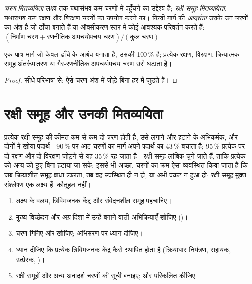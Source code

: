 \begin{definition}[मितव्ययिताएँ और आदर्शता]\label{def:b3:total-synthesis:economy}
\emph{चरण मितव्ययिता} लक्ष्य तक यथासंभव कम चरणों में
पहुँचने का उद्देश्य है; \emph{रक्षी-समूह मितव्ययिता},
यथासंभव कम रक्षण और विरक्षण चरणों का उपयोग करने का। किसी मार्ग की
\emph{आदर्शता} उसके उन चरणों का अंश है जो
ढाँचा बनाते हैं या ऑक्सीकरण स्तर में कोई आवश्यक परिवर्तन करते हैं:
$(\text{निर्माण चरण} + \text{रणनीतिक अपचयोपचय चरण})/(\text{कुल चरण})$।
\end{definition}

\begin{proposition}[किसी मार्ग की आदर्शता]\label{prop:b3:total-synthesis:ideality}
एक-पात्र मार्ग जो केवल ढाँचे के आबंध बनाता है, उसकी  100\,\% है; प्रत्येक रक्षण,
विरक्षण, क्रियात्मक-समूह अंतर्रूपांतरण या गैर-रणनीतिक अपचयोपचय चरण
उसे घटाता है।
\end{proposition}

\begin{proof}
सीधे परिभाषा से: ऐसे चरण अंश में जोड़े बिना हर में
जुड़ते हैं।
\end{proof}

\section{रक्षी समूह और उनकी मितव्ययिता}

प्रत्येक रक्षी समूह की कीमत कम से कम दो चरण होती है, उसे लगाने और
हटाने के अभिकर्मक, और दोनों में खोया पदार्थ। 90\,\% पर आठ चरणों का मार्ग
अपने पदार्थ का 43\,\% बचाता है; 95\,\% प्रत्येक पर दो रक्षण और दो विरक्षण जोड़ने से
यह 35\,\% रह जाता है। रक्षी समूह लांबिक चुने जाते हैं, ताकि प्रत्येक को
अन्य को छुए बिना हटाया जा सके; इससे भी अच्छा, चरणों का क्रम ऐसा
व्यवस्थित किया जाता है कि जब क्रियाशील समूह बाधा डालता, तब वह उपस्थित ही न हो, या अभी
प्रकट न हुआ हो: रक्षी-समूह-मुक्त संश्लेषण एक लक्ष्य हैं, कौतूहल नहीं।

\begin{method}[किसी पूर्ण संश्लेषण को पढ़ना]\label{met:b3:total-synthesis:analyse}
\begin{enumerate}
  \item लक्ष्य के वलय, त्रिविमजनक केंद्र और संवेदनशील समूह पहचानिए।
  \item मुख्य विच्छेदन और अग्र दिशा में उन्हें बनाने वाली अभिक्रियाएँ खोजिए
        ()।
  \item चरण गिनिए और  खोजिए; अभिसरण पर ध्यान दीजिए।
  \item ध्यान दीजिए कि प्रत्येक त्रिविमजनक केंद्र कैसे स्थापित होता है (क्रियाधार नियंत्रण, सहायक, उत्प्रेरक,
        )।
  \item रक्षी समूहों और अन्य अनादर्श चरणों की सूची बनाइए;  और  परिकलित कीजिए।
\end{enumerate}
\end{method}

